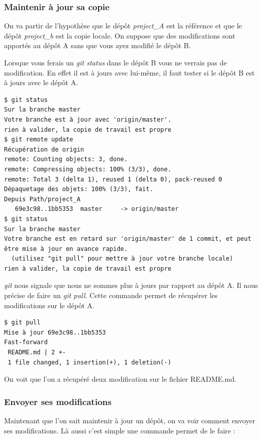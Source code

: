 \documentclass[12pt,a4paper]{article}
\begin{document}
\subsubsection{Maintenir à jour sa copie}

On va partir de l'hypothèse que le dépôt \emph{project\_A} est la référence et que le dépôt \emph{project\_b} est la copie locale. On suppose que des modifications sont apportés au dépôt A sans que vous ayez modifié le dépôt B.

Lorsque vous ferais un \emph{git status} dans le dépôt B vous ne verrais pas de modification. En effet il est à jours avec lui-même, il faut tester si le dépôt B est à jours avec le dépôt A.

\begin{verbatim}
$ git status
Sur la branche master
Votre branche est à jour avec 'origin/master'.
rien à valider, la copie de travail est propre
$ git remote update
Récupération de origin
remote: Counting objects: 3, done.
remote: Compressing objects: 100% (3/3), done.
remote: Total 3 (delta 1), reused 1 (delta 0), pack-reused 0
Dépaquetage des objets: 100% (3/3), fait.
Depuis Path/project_A
   69e3c98..1bb5353  master     -> origin/master
$ git status
Sur la branche master
Votre branche est en retard sur 'origin/master' de 1 commit, et peut
être mise à jour en avance rapide.
  (utilisez "git pull" pour mettre à jour votre branche locale)
rien à valider, la copie de travail est propre
\end{verbatim}

\emph{git} nous signale que nous ne sommes plus à jours par rapport au dépôt A. Il nous précise de faire un \emph{git pull}. Cette commande permet de récupérer les modifications sur le dépôt A.

\begin{verbatim}
$ git pull
Mise à jour 69e3c98..1bb5353
Fast-forward
 README.md | 2 +-
 1 file changed, 1 insertion(+), 1 deletion(-)
\end{verbatim}

On voit que l'on a récupéré deux modification sur le fichier README.md.

\subsubsection{Envoyer ses modifications}

Maintenant que l'on sait maintenir à jour un dépôt, on va voir comment envoyer ses modifications. Là aussi c'est simple une commande permet de le faire :
\end{document}
